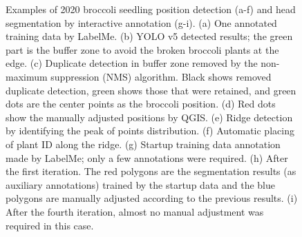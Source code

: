 \begin{figure}[htb]
  \begin{center}
  \end{center}
  \caption[Examples of 2020 broccoli seedling position detection and head segmentation by interactive annotation]{
    Examples of 2020 broccoli seedling position detection (a-f) and head segmentation by interactive annotation (g-i). 
    (a) One annotated training data by LabelMe. 
    (b) YOLO v5 detected results; the green part is the buffer zone to avoid the broken broccoli plants at the edge. 
    (c) Duplicate detection in buffer zone removed by the non-maximum suppression (NMS) algorithm. Black shows removed duplicate detection, green shows those that were retained, and green dots are the center points as the broccoli position. 
    (d) Red dots show the manually adjusted positions by QGIS. 
    (e) Ridge detection by identifying the peak of points distribution. 
    (f) Automatic placing of plant ID along the ridge. 
    (g) Startup training data annotation made by LabelMe; only a few annotations were required. 
    (h) After the first iteration. The red polygons are the segmentation results (as auxiliary annotations) trained by the startup data and the blue polygons are manually adjusted according to the previous results. 
    (i) After the fourth iteration, almost no manual adjustment was required in this case.
  }
  \label{fig:bros1}
\end{figure}